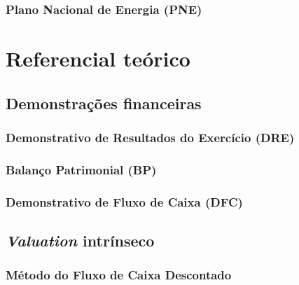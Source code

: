 \documentclass[grad,numbers]{coppe}
\begin{document}
  \hypertarget{plano-nacional-de-energia-pne}{%
  \subsection{Plano Nacional de Energia (PNE)}\label{plano-nacional-de-energia-pne}}
  
  \hypertarget{referencial-teuxf3rico}{%
  \chapter{Referencial teórico}\label{referencial-teuxf3rico}}
  
  \hypertarget{demonstrauxe7uxf5es-financeiras}{%
  \section{Demonstrações financeiras}\label{demonstrauxe7uxf5es-financeiras}}
  
  \hypertarget{demonstrativo-de-resultados-do-exercuxedcio-dre}{%
  \subsection{Demonstrativo de Resultados do Exercício (DRE)}\label{demonstrativo-de-resultados-do-exercuxedcio-dre}}
  
  \hypertarget{balanuxe7o-patrimonial-bp}{%
  \subsection{Balanço Patrimonial (BP)}\label{balanuxe7o-patrimonial-bp}}
  
  \hypertarget{demonstrativo-de-fluxo-de-caixa-dfc}{%
  \subsection{Demonstrativo de Fluxo de Caixa (DFC)}\label{demonstrativo-de-fluxo-de-caixa-dfc}}
  
  \hypertarget{valuation-intruxednseco}{%
  \section{\texorpdfstring{\emph{Valuation} intrínseco}{Valuation intrínseco}}\label{valuation-intruxednseco}}
  
  \hypertarget{muxe9todo-do-fluxo-de-caixa-descontado}{%
  \subsection{Método do Fluxo de Caixa Descontado}\label{muxe9todo-do-fluxo-de-caixa-descontado}}
  
\end{document}

